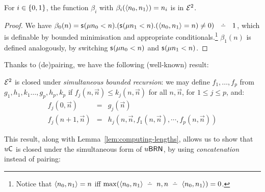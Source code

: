 \documentclass{lmcs}
\begin{document}
\begin{proposition}
	[Depairing]
	\label{prop:depairing}
	For $i\in \{0,1\}$, the function $\beta_i$ with $\beta_i (\langle  n_0 ,  n_1 \rangle) = {n_i}$ is in $\mathcal{E}^2$.
\end{proposition}
\begin{proof}
	We have $\beta_0 (n) = \least {n_0 < n }. (\least {n_1 < n }. (\pair{n_0}{n_1} = n ) \neq 0) \ \subtr \ 1$, which is definable by bounded minimisation and appropriate conditionals.\footnote{Notice that $\langle n_0 , n_1 \rangle = n$ iff $\max (\pair{n_0}{n_1} \subtr n , n \subtr \pair{n_0}{n_1} ) = 0$.}
	$\beta_1 (n)$ is defined analogously, by switching $\mathsf s_{}(\mu n_0 <n)$ and $\mathsf s_{}(\mu n_1<n)$.
\end{proof}



Thanks to (de)pairing, we have the following (well-known) result:
\begin{proposition}
	\label{prop:sim-br}
	$\mathcal{E}^2$ is closed under \emph{simultaneous bounded recursion}: 
	we may define $f_1 , \dots , f_p $ from $g_1, h_1, k_1 \dots , g_p , h_p , k_p$ if $f_j (n , \vec n) \leq k_j (n, \vec n)$ for all $n, \vec n$, for $1 \leq j \leq p$, and:
	\[
	\begin{array}{rcl}
	f_j (0 , \vec n) & = & g_j (\vec n) \\
	f_j (n + 1 , \vec n) & = & h_j ( n , \vec n , f_1 (n , \vec n) , \cdots , f_p (n, \vec n ))
	\end{array}
	\]
\end{proposition}

\noindent
This result, along with Lemma~\ref{lem:computing-lengths}, allows us to show that $u \mathsf{C}$ is closed under the simultaneous form of $u\mathsf{BRN}$, by using \emph{concatenation} instead of pairing:
\end{document}
